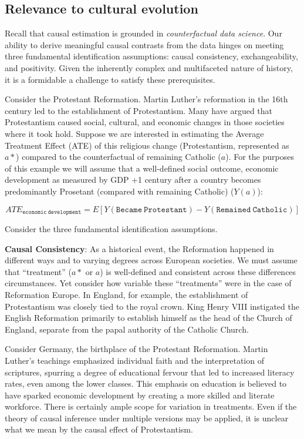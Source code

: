\documentclass[
  singlecolumn]{report}
\begin{document}
\hypertarget{relevance-to-cultural-evolution}{%
\subsection{Relevance to cultural
evolution}\label{relevance-to-cultural-evolution}}

Recall that causal estimation is grounded in \emph{counterfactual data
science}. Our ability to derive meaningful causal contrasts from the
data hinges on meeting three fundamental identification assumptions:
causal consistency, exchangeability, and positivity. Given the
inherently complex and multifaceted nature of history, it is a
formidable a challenge to satisfy these prerequisites.

Consider the Protestant Reformation. Martin Luther's reformation in the
16th century led to the establishment of Protestantism. Many have argued
that Protestantism caused social, cultural, and economic changes in
those societies where it took hold. Suppose we are interested in
estimating the Average Treatment Effect (ATE) of this religious change
(Protestantism, represented as \(a*\)) compared to the counterfactual of
remaining Catholic (\(a\)). For the purposes of this example we will
assume that a well-defined social outcome, economic development as
measured by GDP +1 century after a country becomes predominantly
Prosetant (compared with remaining Catholic) (\(Y(a)\)):

\[ATE_{\mathtt{economic~development}} = E[Y(\mathtt{Became~Protestant}) - Y(\mathtt{Remained~Catholic})]\]

Consider the three fundamental identification assumptions.

\textbf{Causal Consistency}: As a historical event, the Reformation
happened in different ways and to varying degrees across European
societies. We must assume that ``treatment'' (\(a*\) or \(a\)) is
well-defined and consistent across these differences circumstances. Yet
consider how variable these ``treatments'' were in the case of
Reformation Europe. In England, for example, the establishment of
Protestantism was closely tied to the royal crown. King Henry VIII
instigated the English Reformation primarily to establish himself as the
head of the Church of England, separate from the papal authority of the
Catholic Church.

Consider Germany, the birthplace of the Protestant Reformation. Martin
Luther's teachings emphasized individual faith and the interpretation of
scriptures, spurring a degree of educational fervour that led to
increased literacy rates, even among the lower classes. This emphasis on
education is believed to have sparked economic development by creating a
more skilled and literate workforce. There is certainly ample scope for
variation in treatments. Even if the theory of causal inference under
multiple versions may be applied, it is unclear what we mean by the
causal effect of Protestantism.
\end{document}
